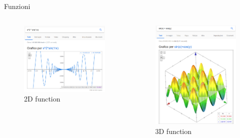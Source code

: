 \documentclass{beamer}
\begin{document}
\begin{frame}{Funzioni}
\begin{columns}
\begin{column}{0.5\linewidth}
\begin{figure}[h!]
\includegraphics[width=\linewidth]{immagini/2d.png}
\caption{2D function}
\end{figure}
\end{column}
\begin{column}{0.5\linewidth}
\begin{figure}[h!]
\includegraphics[height=0.7\textheight]{immagini/3d.png}
\caption{3D function}
\end{figure}
\end{column}
\end{columns}
\end{frame}
\end{document}

